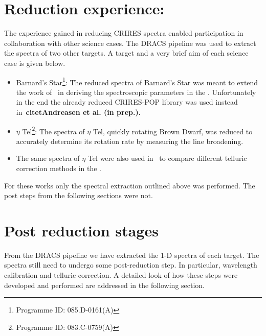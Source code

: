 \section{Reduction experience:}
The experience gained in reducing CRIRES spectra enabled participation in collaboration with other science cases. The DRACS pipeline was used to extract the spectra of two other targets. A target and a very brief aim of each science case is given below.
\begin{itemize}
\item Barnard's Star\footnote{Programme ID: 085.D-0161(A)}: The reduced {\nir} spectra of Barnard's Star was meant to extend the work of~\citet{andreasen_nearinfrared_2016} in deriving the spectroscopic parameters in the \nir. Unfortunately in the end the already reduced CRIRES-POP library was used instead in~\bf{citet{Andreasen et al. (in prep.)}}. 
\item $\eta$ Tel\footnote{Programme ID: 083.C-0759(A)}: The spectra of $\eta$ Tel, quickly rotating Brown Dwarf, was reduced to accurately determine its rotation rate by measuring the line broadening. 
\item The same spectra of $\eta$ Tel were also used in~\citet{ulmer-moll_telluric_2018} to compare different telluric correction methods in the \nir.
\end{itemize}

For these works only the spectral extraction outlined above was performed. The post  steps from the following sections were not.


\section{Post reduction stages}
\label{sec:posreduction}
From the DRACS pipeline we have extracted the 1-D spectra of each target. The spectra still need to undergo some post-reduction step. In particular, wavelength calibration and telluric correction. A detailed look of how these steps were developed and performed are addressed in the following section.


